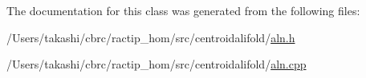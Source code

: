 The documentation for this class was generated from the following files\+:\begin{DoxyCompactItemize}
\item 
/\+Users/takashi/cbrc/ractip\+\_\+hom/src/centroidalifold/\hyperlink{aln_8h}{aln.\+h}\item 
/\+Users/takashi/cbrc/ractip\+\_\+hom/src/centroidalifold/\hyperlink{aln_8cpp}{aln.\+cpp}\end{DoxyCompactItemize}
